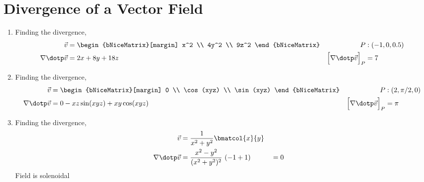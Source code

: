 \section{Divergence of a Vector Field}

\begin{enumerate}
    \item Finding the divergence,
          \begin{align}
              \vec{v}                          & = \begin{bNiceMatrix}[margin]
                                                       x^2 \\ 4y^2 \\ 9z^2
                                                   \end{bNiceMatrix} &
              P                                & : (-1, 0, 0.5)                  \\
              \nabla \dotp \vec{v}             & = 2x + 8y + 18z               &
              \Big[\nabla \dotp \vec{v}\Big]_P & = 7
          \end{align}

    \item Finding the divergence,
          \begin{align}
              \vec{v}                          & = \begin{bNiceMatrix}[margin]
                                                       0 \\ \cos(xyz) \\ \sin(xyz)
                                                   \end{bNiceMatrix}     &
              P                                & : (2, \pi/2, 0)                     \\
              \nabla \dotp \vec{v}             & = 0  -xz \sin(xyz) + xy \cos(xyz) &
              \Big[\nabla \dotp \vec{v}\Big]_P & = \pi
          \end{align}

    \item Finding the divergence,
          \begin{align}
              \vec{v}              & = \frac{1}{x^2 + y^2}
              \bmatcol{x}{y}                                                       \\
              \nabla \dotp \vec{v} & = \frac{x^2 - y^2}{(x^2 + y^2)^2}\ (-1 + 1) &
                                   & = 0
          \end{align}
          Field is solenoidal


\end{enumerate}
